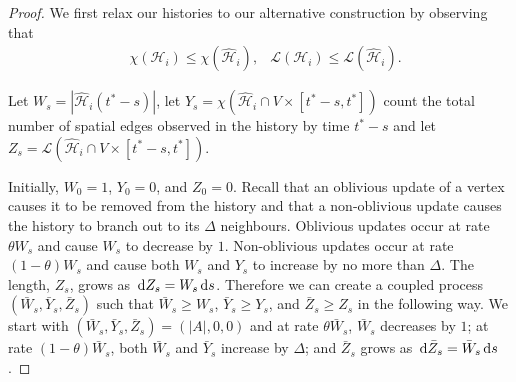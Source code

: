 	\begin{proof}
		We first relax our histories to our alternative construction by observing that
		\begin{align}
			&\chi(\mathcal{H}_i) \leq \chi(\hat{\mathcal{H}}_i), &\mathcal{L}(\mathcal{H}_i) \leq \mathcal{L}(\hat{\mathcal{H}}_i).
		\end{align}


		Let $W_s = |\hat{\mathcal{H}}_i (t^* - s)|$, let $Y_s = \chi(\hat{\mathcal{H}}_i \cap V \times [t^* - s, t^*])$ count the total number of spatial edges observed in the history by time $t^* - s$ and let $Z_s = \mathcal{L}(\hat{\mathcal{H}}_i \cap V \times [t^* - s, t^*])$. 

		Initially, $W_0 = 1$, $Y_0 = 0$, and $Z_0 = 0$. Recall that an oblivious update of a vertex causes it to be removed from the history and that a non-oblivious update causes the history to branch out to its $\Delta$ neighbours. Oblivious updates occur at rate $\theta W_s$ and cause $W_s$ to decrease by $1$. Non-oblivious updates occur at rate $(1 - \theta)W_s$ and cause both $W_s$ and $Y_s$ to increase by no more than $\Delta$. The length, $Z_s$, grows as $\, \mathrm{d} Z_s = W_s \, \mathrm{d} s$. Therefore we can create a coupled process $(\bar{W}_s, \bar{Y}_s, \bar{Z}_s)$ such that $\bar{W}_s \geq W_s$, $\bar{Y}_s \geq Y_s$, and $\bar{Z}_s \geq Z_s$ in the following way. We start with $(\bar{W}_s, \bar{Y}_s, \bar{Z}_s) = (|A|, 0, 0)$ and at rate $\theta \bar{W}_s$, $\bar{W}_s$ decreases by $1$; at rate $(1 - \theta)\bar{W}_s$, both $\bar{W}_s$ and $\bar{Y}_s$ increase by $\Delta$; and $\bar{Z}_s$ grows as $\, \mathrm{d} \bar{Z}_s = \bar{W}_s \, \mathrm{d} s$.


\end{proof}
